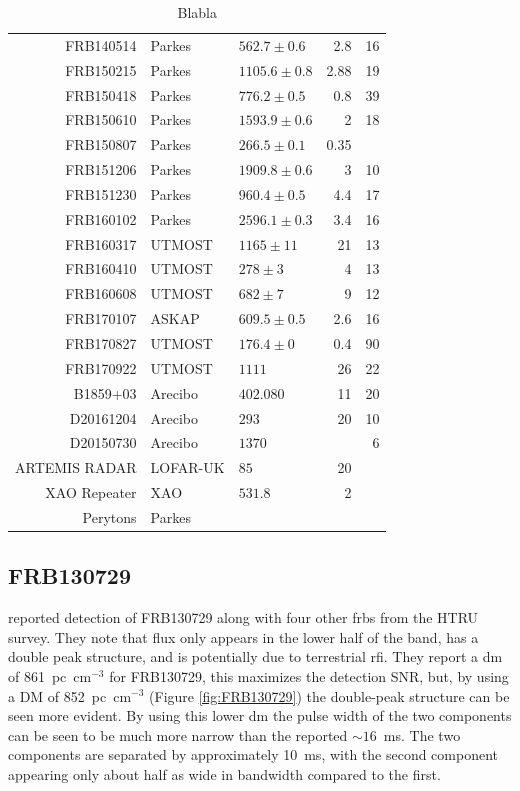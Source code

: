 \documentclass[a4paper,fleqn,usenatbib]{mnras}
\begin{document}
\begin{table}
\begin{tabular}{ r l l r r }
FRB140514 & Parkes  & $562.7 \pm 0.6$    &  2.8		&	16   \\ 
FRB150215 & Parkes  & $1105.6 \pm 0.8$   &  2.88	&	19   \\ 
FRB150418 & Parkes  & $776.2 \pm 0.5$    &  0.8		&	39   \\ 
FRB150610 & Parkes  & $1593.9 \pm 0.6$   &  2		&	18   \\ 
FRB150807 & Parkes  & $266.5 \pm 0.1$    &  0.35	&	     \\ 
FRB151206 & Parkes  & $1909.8 \pm 0.6$   &  3		&	10   \\ 
FRB151230 & Parkes  & $960.4 \pm 0.5$    &  4.4		&	17   \\ 
FRB160102 & Parkes  & $2596.1 \pm 0.3$   &  3.4		&	16   \\ 
FRB160317 & UTMOST  & $1165 \pm 11$      &  21		&	13   \\ 
FRB160410 & UTMOST  & $278 \pm 3$        &  4		&	13   \\ 
FRB160608 & UTMOST  & $682 \pm 7$        &  9		&	12   \\ 
FRB170107 & ASKAP   & $609.5 \pm 0.5$    &  2.6		&	16   \\ 
FRB170827 & UTMOST  & $176.4 \pm 0$      &  0.4		&	90   \\ 
FRB170922 & UTMOST  & $1111$             &  26		&	22   \\
\hline
B1859+03  & Arecibo & $402.080$          &  11      &   20   \\ %
D20161204 & Arecibo & $293$              &  20      &   10   \\
D20150730 & Arecibo & $1370$             &          &    6   \\
ARTEMIS RADAR & LOFAR-UK & $85$          &  20      &        \\
XAO Repeater & XAO  & $531.8$            &  2       &        \\
Perytons  & Parkes  &                    &          &        \\
\end{tabular}
\caption{Blabla}
\label{tbl:frbs}
\end{table}

\subsection{FRB130729}

\cite{2016MNRAS.460L..30C} reported detection of FRB130729 along with four other
\glspl{frb} from the HTRU survey. They note that flux only appears in the lower
half of the band, has a double peak structure, and is potentially due to
terrestrial \gls{rfi}.  They report a \gls{dm} of 861~pc~cm$^{-3}$ for
FRB130729, this maximizes the detection SNR, but, by using a DM of
852~pc~cm$^{-3}$ (Figure \ref{fig:FRB130729}) the double-peak structure can be
seen more evident. By using this lower \gls{dm} the pulse width of the two
components can be seen to be much more narrow than the reported $\sim 16$~ms.
The two components are separated by approximately 10~ms, with the second
component appearing only about half as wide in bandwidth compared to the first. 
\end{document}

